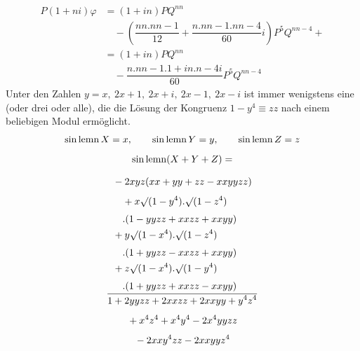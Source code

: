 \[
\begin{aligned}
P(1+ni)\varphi
 &= (1+in)PQ^{nn}
 \\[5pt]&\quad{}-\left(\dfrac{nn.nn-1}{12}+\dfrac{n.nn-1.nn-4}{60}i\right)P^5Q^{nn-4}+{}\\[7pt]
 &= (1+in)PQ^{nn}\\[5pt]&\quad{}-\dfrac{n.nn-1.1+in.n-4i}{60}P^5Q^{nn-4}
\end{aligned}
\]
Unter den Zahlen $y=x,\ 2x+1,\ 2x+i,\ 2x-1,\ 2x-i$ ist immer wenigstens eine (oder drei oder alle), die die Lösung der Kongruenz $1-y^4\equiv zz$ nach einem beliebigen Modul ermöglicht.
\[
\operatorname{sin\,lemn} X=x,\qquad \operatorname{sin\,lemn} Y=y,\qquad \operatorname{sin\,lemn} Z=z
\]
\[
\begin{gathered}\operatorname{sin\,lemn}(X+Y+Z)=\\[7pt]
\dfrac{\begin{aligned}
 &-2xyz(xx+yy+zz-xxyyzz)\\[4pt]&\quad{}+x\surd(1-y^4).\surd(1-z^4)\\[3pt]&\quad{}.(1-yyzz+xxzz+xxyy)\\
 &+y\surd(1-x^4).\surd(1-z^4)\\[3pt]&\quad{}.(1+yyzz-xxzz+xxyy)\\
 &+z\surd(1-x^4).\surd(1-y^4)\\[3pt]&\quad{}.(1+yyzz+xxzz-xxyy)
\end{aligned}}{\begin{gathered}1+2yyzz+2xxzz+2xxyy+y^4z^4\\[4pt]{}+x^4z^4+x^4y^4-2x^4yyzz\\[4pt]{}-2xxy^4zz-2xxyyz^4\end{gathered}}\end{gathered}
\]

